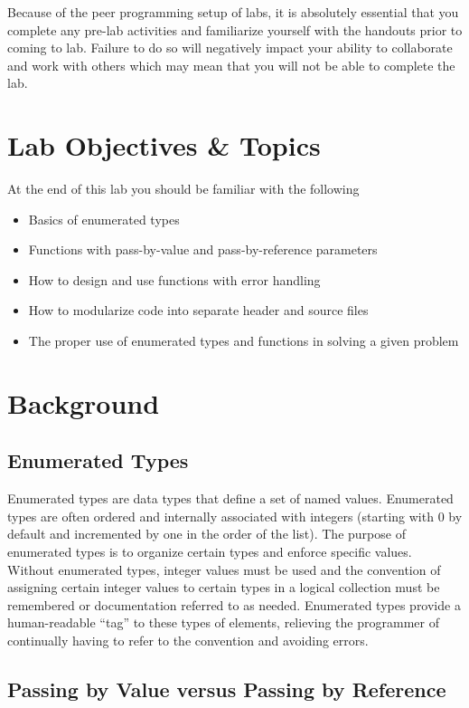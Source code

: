 \documentclass[12pt]{scrartcl}
\begin{document}
Because of the peer programming setup of labs, it is absolutely 
essential that you complete any pre-lab activities and familiarize
yourself with the handouts prior to coming to lab.  Failure to do
so will negatively impact your ability to collaborate and work with 
others which may mean that you will not be able to complete the
lab.  

\section{Lab Objectives \& Topics}
At the end of this lab you should be familiar with the following
\begin{itemize}
  \item Basics of enumerated types
  \item Functions with pass-by-value and pass-by-reference parameters
  \item How to design and use functions with error handling
  \item How to modularize code into separate header and source files
  \item The proper use of enumerated types and functions in solving a 
  given problem 
\end{itemize}

\section{Background}

\subsection*{Enumerated Types}

Enumerated types are data types that define a set of named values.  
Enumerated types are often ordered and internally associated with 
integers (starting with 0 by default and incremented by one in the 
order of the list).  The purpose of enumerated types is to organize 
certain types and enforce specific values.  Without enumerated types, 
integer values must be used and the convention of assigning certain 
integer values to certain types in a logical collection must be remembered 
or documentation referred to as needed.  Enumerated types provide 
a human-readable ``tag'' to these types of elements, relieving the 
programmer of continually having to refer to the convention and avoiding 
errors.

\subsection*{Passing by Value versus Passing by Reference}
\end{document}
